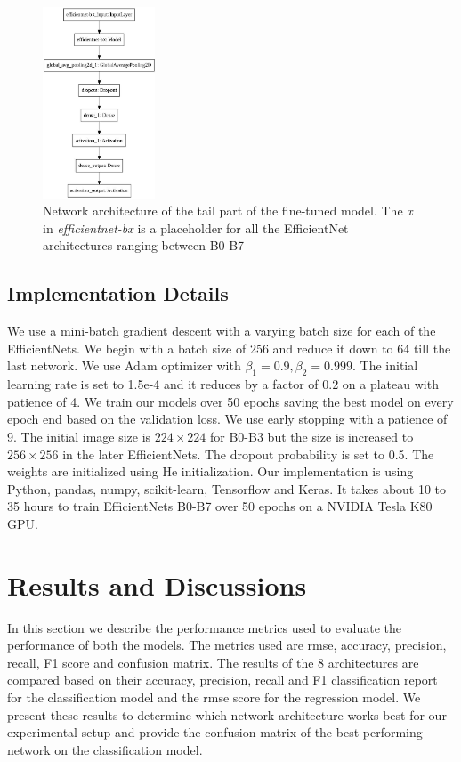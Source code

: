 \documentclass[fleqn,usenatbib]{mnras}
\begin{document}
\begin{figure}
    \centering
    \includegraphics[width=0.3\textwidth, height=0.5\textwidth]{images/network_arch.jpeg}
    \caption{Network architecture of the tail part of the fine-tuned model. The \textit{x} in \textit{efficientnet-bx} is a placeholder for all the EfficientNet architectures ranging between B0-B7}
    \label{fig:Network Architecture}
\end{figure}

\subsection{Implementation Details}
\hspace*{0.25in}We use a mini-batch gradient descent with a varying batch size for each of the EfficientNets. We begin with a batch size of 256 and reduce it down to 64 till the last network. We use Adam optimizer with $\beta_1 = 0.9 , \beta_2 = 0.999$. The initial learning rate is set to 1.5e-4 and it reduces by a factor of 0.2 on a plateau with patience of 4. We train our models over 50 epochs saving the best model on every epoch end based on the validation loss. We use early stopping with a patience of 9. The initial image size is $224\times224$ for B0-B3 but the size is increased to $256\times256$ in the later EfficientNets. The dropout probability is set to 0.5. The weights are initialized using He initialization. Our implementation is using Python, pandas, numpy, scikit-learn, Tensorflow and Keras. It takes about 10 to 35 hours to train EfficientNets B0-B7 over 50 epochs on a NVIDIA Tesla K80 GPU.

\section{Results and Discussions}
\hspace*{0.25in}In this section we describe the performance metrics used to evaluate the performance of both the models. The metrics used are rmse, accuracy, precision, recall, F1 score and confusion matrix. The results of the 8 architectures are compared based on their accuracy, precision, recall and F1 classification report for the classification model and the rmse score for the regression model. We present these results to determine which network architecture works best for our experimental setup and provide the confusion matrix of the best performing network on the classification model.
\end{document}
